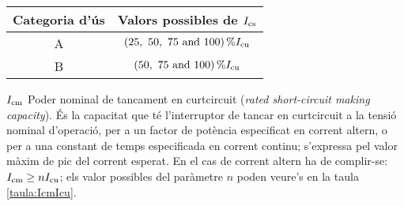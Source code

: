 \begin{list}{}
        \begin{center}
            \label{taula:IcsIcu}
           \begin{tabular}{cc}
           \toprule[1pt]
           Categoria d'ús &  Valors possibles de $I_\mathrm{cs}$ \\
           \midrule
           A & $\qtylist[list-units = brackets]{25;50;75;100}{\percent} I\ped{cu}$ \\
           B & $\qtylist[list-units = brackets]{50;75;100}{\percent} I\ped{cu}$  \\
           \bottomrule[1pt]
           \end{tabular}
         \end{center}
    \item[$I_\mathrm{cm}$] Poder nominal de tancament en curtcircuit (\textit{rated short-circuit making capacity}). És la capacitat que té l'interruptor de tancar en curtcircuit a la tensió nominal d'operació, per a un factor de potència especificat en corrent altern, o per a una constant de temps especificada en corrent continu; s'expressa pel valor màxim de pic del corrent esperat. En el cas de corrent altern ha de complir-se: $I_\mathrm{cm} \geq n I_\mathrm{cu}$; els valor possibles del paràmetre $n$ poden veure's en la taula \vref{taula:IcmIcu}.


\end{list}
